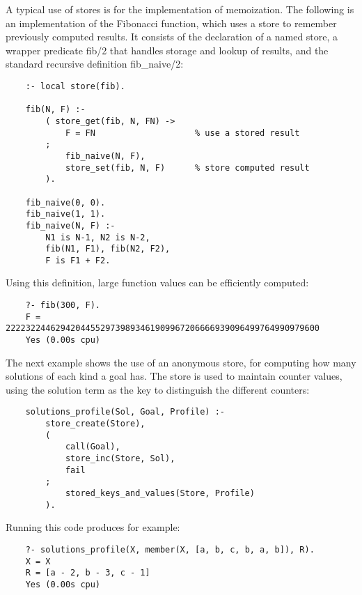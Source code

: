 A typical use of stores is for the implementation of memoization.
The following is an implementation of the Fibonacci function, which
uses a store to remember previously computed results.
It consists of the declaration of a named store, a wrapper predicate
fib/2 that handles storage and lookup of results, and the standard
recursive definition fib_naive/2:
\begin{verbatim}
    :- local store(fib).

    fib(N, F) :-
        ( store_get(fib, N, FN) ->
            F = FN                    % use a stored result
        ;
            fib_naive(N, F),
            store_set(fib, N, F)      % store computed result
        ).

    fib_naive(0, 0).
    fib_naive(1, 1).
    fib_naive(N, F) :-
        N1 is N-1, N2 is N-2,
        fib(N1, F1), fib(N2, F2),
        F is F1 + F2.
\end{verbatim}
Using this definition, large function values can be efficiently computed:
\begin{verbatim}
    ?- fib(300, F).
    F = 222232244629420445529739893461909967206666939096499764990979600
    Yes (0.00s cpu)
\end{verbatim}



The next example shows the use of an anonymous store, for computing
how many solutions of each kind a goal has.
The store is used to maintain counter values, using the
solution term as the key to distinguish the different counters:
\begin{verbatim}
    solutions_profile(Sol, Goal, Profile) :-
        store_create(Store),
        (
            call(Goal),
            store_inc(Store, Sol),
            fail
        ;
            stored_keys_and_values(Store, Profile)
        ).
\end{verbatim}
Running this code produces for example:
\begin{verbatim}
    ?- solutions_profile(X, member(X, [a, b, c, b, a, b]), R).
    X = X
    R = [a - 2, b - 3, c - 1]
    Yes (0.00s cpu)
\end{verbatim}


